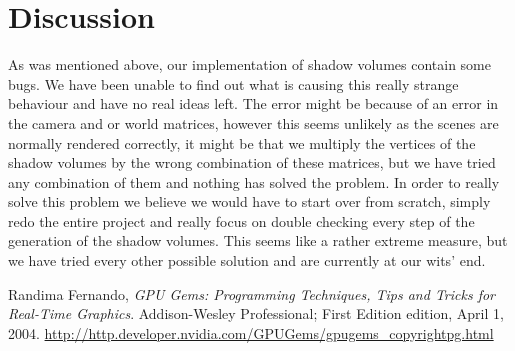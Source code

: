 \documentclass[a4paper, 12pt]{article}
\begin{document}
\section{Discussion}
As was mentioned above, our implementation of shadow volumes contain some
bugs. We have been unable to find out what is causing this really strange
behaviour and have no real ideas left. The error might be because of an error in
the camera and or world matrices, however this seems unlikely as the scenes are
normally rendered correctly, it might be that we multiply the vertices of the
shadow volumes by the wrong combination of these matrices, but we have tried
any combination of them and nothing has solved the problem. In order to really
solve this problem we believe we would have to start over from scratch, simply
redo the entire project and really focus on double checking every step of the
generation of the shadow volumes. This seems like a rather extreme measure, but
we have tried every other possible solution and are currently at our wits' end.

\begin{thebibliography}{9}
	Randima Fernando,
	\emph{GPU Gems: Programming Techniques, Tips and Tricks for Real-Time
	Graphics}.
	Addison-Wesley Professional; First Edition edition, April 1, 2004.
	\url{http://http.developer.nvidia.com/GPUGems/gpugems\_copyrightpg.html}
\end{thebibliography}
\end{document}
